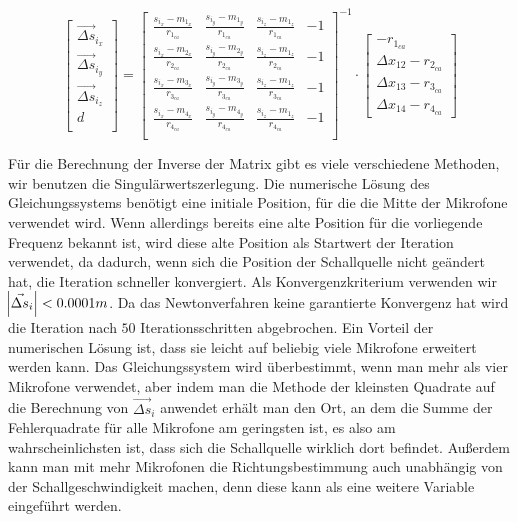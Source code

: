 $$
\begin{bmatrix}
\vec{\Delta{s}}_{i_x} \\
\vec{\Delta{s}}_{i_y} \\
\vec{\Delta{s}}_{i_z} \\
                d \\
\end{bmatrix}
=
{\begin{bmatrix}
\frac{s_{i_x} - m_{1_x}}{r_{1_{ca}}} & \frac{s_{i_y} - m_{1_y}}{r_{1_{ca}}} & \frac{s_{i_z} - m_{1_z}}{r_{1_{ca}}} & -1 \\
\frac{s_{i_x} - m_{2_x}}{r_{2_{ca}}} & \frac{s_{i_y} - m_{2_y}}{r_{2_{ca}}} & \frac{s_{i_z} - m_{1_z}}{r_{2_{ca}}} & -1 \\
\frac{s_{i_x} - m_{3_x}}{r_{3_{ca}}} & \frac{s_{i_y} - m_{3_y}}{r_{3_{ca}}} & \frac{s_{i_z} - m_{1_z}}{r_{3_{ca}}} & -1 \\
\frac{s_{i_x} - m_{4_x}}{r_{4_{ca}}} & \frac{s_{i_y} - m_{4_y}}{r_{4_{ca}}} & \frac{s_{i_z} - m_{1_z}}{r_{4_{ca}}} & -1 \\
\end{bmatrix}}^{-1}
\cdot
\begin{bmatrix}
-r_{1_{ca}}\\
\Delta{x_{12}} - r_{2_{ca}}\\
\Delta{x_{13}} - r_{3_{ca}}\\
\Delta{x_{14}} - r_{4_{ca}}
\end{bmatrix}
$$

Für die Berechnung der Inverse der Matrix gibt es viele verschiedene Methoden, wir benutzen die Singulärwertszerlegung. Die numerische Lösung des Gleichungssystems benötigt eine initiale Position, für die die Mitte der Mikrofone verwendet wird. Wenn allerdings bereits eine alte Position für die vorliegende Frequenz bekannt ist, wird diese alte Position als Startwert der Iteration verwendet, da dadurch, wenn sich die Position der Schallquelle nicht geändert hat, die Iteration schneller konvergiert. Als Konvergenzkriterium verwenden wir $\abs{\vec{\Delta{s}}_i} < 0.0001m$. Da das Newtonverfahren keine garantierte Konvergenz hat wird die Iteration nach $50$ Iterationsschritten abgebrochen.
Ein Vorteil der numerischen Lösung ist, dass sie leicht auf beliebig viele Mikrofone erweitert werden kann. Das Gleichungssystem wird überbestimmt, wenn man mehr als vier Mikrofone verwendet, aber indem man die Methode der kleinsten Quadrate auf die Berechnung von $\vec{\Delta{s}}_i$ anwendet erhält man den Ort, an dem die Summe der Fehlerquadrate für alle Mikrofone am geringsten ist, es also am wahrscheinlichsten ist, dass sich die Schallquelle wirklich dort befindet. Außerdem kann man mit mehr Mikrofonen die Richtungsbestimmung auch unabhängig von der Schallgeschwindigkeit machen, denn diese kann als eine weitere Variable eingeführt werden.